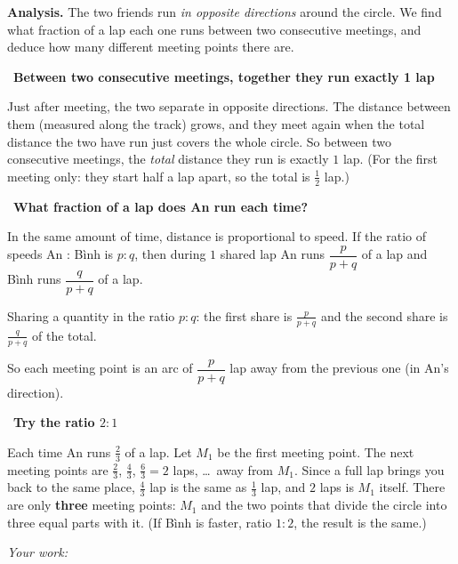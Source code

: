 \documentclass[11pt]{article}
\newif\ifsol \solfalse
\newcommand{\probsol}[1]{%
  \begin{lrbox}{\solmeasure}\begin{minipage}{\dimexpr\linewidth-24pt\relax}#1\end{minipage}\end{lrbox}%
  \ifsol
    \begin{solbox}#1\end{solbox}%
  \else
    \setlength{\solht}{\dimexpr\ht\solmeasure+\dp\solmeasure+0.85cm\relax}%
    \ifdim\solht<1.35cm\setlength{\solht}{1.35cm}\fi
    \ifdim\solht>\StudentMaxWork\setlength{\solht}{\StudentMaxWork}\fi
    \begin{tcolorbox}[colback=white,colframe=Line,boxrule=0.8pt,arc=5pt,
      left=8pt,right=8pt,top=4pt,bottom=4pt,height=\solht]{\footnotesize\color{Slate}\itshape\WorkWord}\end{tcolorbox}%
  \fi}
\newlength{\StudentMaxWork}\setlength{\StudentMaxWork}{7.5cm}
\newcommand{\step}[2]{\par\smallskip\noindent{\bfseries\color{tmBlue!85!black}\StepWord~#1.}\ {\bfseries #2}\par\nopagebreak}
\def\WorkWord{Your work:}
\def\StepWord{Step}
\begin{document}
\probsol{
\textbf{Analysis.} The two friends run \emph{in opposite directions} around the circle. We find what fraction of a lap each one runs between two consecutive meetings, and deduce how many different meeting points there are.

\step{1}{Between two consecutive meetings, together they run exactly 1 lap}
\begin{proofbox}Just after meeting, the two separate in opposite directions. The distance between them (measured along the track) grows, and they meet again when the total distance the two have run just covers the whole circle. So between two consecutive meetings, the \emph{total} distance they run is exactly $1$ lap. (For the first meeting only: they start half a lap apart, so the total is $\frac12$ lap.)\end{proofbox}

\step{2}{What fraction of a lap does An run each time?}
In the same amount of time, distance is proportional to speed. If the ratio of speeds An : Bình is $p:q$, then during $1$ shared lap An runs $\dfrac{p}{p+q}$ of a lap and Bình runs $\dfrac{q}{p+q}$ of a lap.
\begin{recallbox}Sharing a quantity in the ratio $p:q$: the first share is $\frac{p}{p+q}$ and the second share is $\frac{q}{p+q}$ of the total.\end{recallbox}
So each meeting point is an arc of $\dfrac{p}{p+q}$ lap away from the previous one (in An's direction).

\step{3}{Try the ratio $2:1$}
Each time An runs $\frac{2}{3}$ of a lap. Let $M_1$ be the first meeting point. The next meeting points are $\frac23$, $\frac43$, $\frac63=2$ laps, \dots\ away from $M_1$. Since a full lap brings you back to the same place, $\frac43$ lap is the same as $\frac13$ lap, and $2$ laps is $M_1$ itself. There are only \textbf{three} meeting points: $M_1$ and the two points that divide the circle into three equal parts with it. (If Bình is faster, ratio $1:2$, the result is the same.)

}
\end{document}

